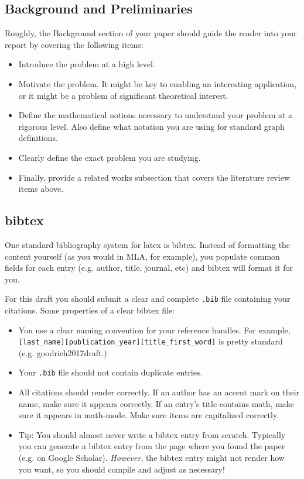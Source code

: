 \documentclass{article}
\begin{document}
\subsection*{Background and Preliminaries}
Roughly, the Background section of your paper should guide the reader into your report by covering the following items:
\begin{itemize}
\item Introduce the problem at a high level.
\item Motivate the problem. It might be key to enabling an interesting application, or it might be a problem of significant theoretical interest.
\item Define the mathematical notions necessary to understand your problem at a rigorous level. Also define what notation you are using for standard graph definitions.
\item Clearly define the exact problem you are studying.
\item Finally, provide a related works subsection that covers the literature review items above.
\end{itemize}

\subsection*{bibtex}
One standard bibliography system for latex is bibtex. Instead of formatting the content yourself (as you would in MLA, for example), you populate common fields for each entry (e.g. author, title, journal, etc) and bibtex will format it for you.

For this draft you should submit a clear and complete \texttt{.bib} file containing your citations. Some properties of a clear bibtex file:
\begin{itemize}
\item You use a clear naming convention for your reference handles. For example, \\ \texttt{[last\_name][publication\_year][title\_first\_word]} is pretty standard (e.g. goodrich2017draft.)
\item Your \texttt{.bib} file should not contain duplicate entries.
\item All citations should render correctly. If an author has an accent mark on their name, make sure it appears correctly. If an entry's title contains math, make sure it appears in math-mode. Make sure items are capitalized correctly.
\item Tip: You should almost never write a bibtex entry from scratch. Typically you can generate a bibtex entry from the page where you found the paper (e.g. on Google Scholar). \emph{However}, the bibtex entry might not render how you want, so you should compile and adjust as necessary!
\end{itemize}
\end{document}
